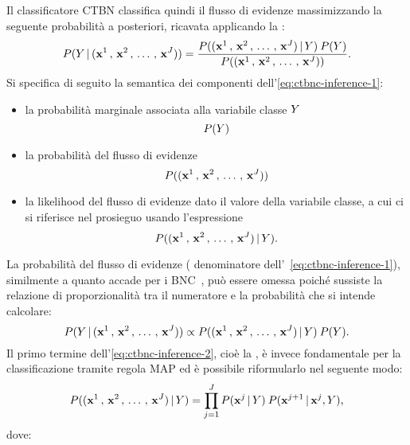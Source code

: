 Il classificatore \acs{CTBN} classifica quindi il flusso di evidenze massimizzando la seguente probabilità a posteriori, ricavata applicando la \emph{}:
\begin{equation}\label{eq:ctbnc-inference-1}
P(\mathnormal{Y}\,\arrowvert\,(\mathbf{x}^1\,,\,\mathbf{x}^2\,,\,\dotsc\,,\,\mathbf{x}^{J}))=\frac{P((\mathbf{x}^1\,,\,\mathbf{x}^2\,,\,\dotsc\,,\,\mathbf{x}^{J})\,\arrowvert\,\mathnormal{Y})\:P(\mathnormal{Y})}{P((\mathbf{x}^1\,,\,\mathbf{x}^2\,,\,\dotsc\,,\,\mathbf{x}^{J}))}\text{.}
\end{equation}
Si specifica di seguito la semantica dei componenti dell'\autoref{eq:ctbnc-inference-1}:
\begin{itemize}
\item la probabilità marginale associata alla variabile classe $\mathnormal{Y}$ \[P(\mathnormal{Y})\]
\item la probabilità del flusso di evidenze \[P((\mathbf{x}^1\,,\,\mathbf{x}^2\,,\,\dotsc\,,\,\mathbf{x}^{J}))\]
\item la likelihood del flusso di evidenze dato il valore della variabile classe, a cui ci si riferisce nel prosieguo usando l'espressione \emph{} \[P((\mathbf{x}^1\,,\,\mathbf{x}^2\,,\,\dotsc\,,\,\mathbf{x}^{J})\,\arrowvert\,\mathnormal{Y})\text{.}\]
\end{itemize}
La probabilità del flusso di evidenze (\ie{} denominatore dell'~\autoref{eq:ctbnc-inference-1}), similmente a quanto accade per i \acs{BNC}~\citep{Friedman1997}, può essere omessa poiché sussiste la relazione di proporzionalità tra il numeratore e la probabilità che si intende calcolare:%
\begin{equation}\label{eq:ctbnc-inference-2}
P(\mathnormal{Y}\,\arrowvert\,(\mathbf{x}^1\,,\,\mathbf{x}^2\,,\,\dotsc\,,\,\mathbf{x}^{J})) \propto P((\mathbf{x}^1\,,\,\mathbf{x}^2\,,\,\dotsc\,,\,\mathbf{x}^{J})\,\arrowvert\,\mathnormal{Y})\:P(\mathnormal{Y})\text{.}
\end{equation}
Il primo termine dell'\autoref{eq:ctbnc-inference-2}, cioè la \emph{}, è invece fondamentale per la classificazione tramite regola \acs{MAP} ed è possibile riformularlo nel seguente modo:
\begin{equation}\label{eq:ctbnc-inference-3}
P((\mathbf{x}^1\,,\,\mathbf{x}^2\,,\,\dotsc\,,\,\mathbf{x}^{J})\,\arrowvert\,\mathnormal{Y})=\prod_{j=1}^{J} P(\mathbf{x}^j\,\arrowvert\,\mathnormal{Y})\:P(\mathbf{x}^{j+1}\,\arrowvert\,\mathbf{x}^j,\mathnormal{Y})\text{,}
\end{equation}
dove:
